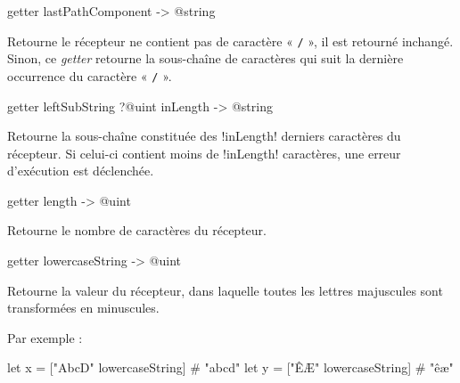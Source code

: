 
\begin{galgasbox}
getter lastPathComponent -> @string
\end{galgasbox}

Retourne le récepteur ne contient pas de caractère « \texttt{/} », il est retourné inchangé. Sinon, ce \emph{getter} retourne la sous-chaîne de caractères qui suit la dernière occurrence du caractère « \texttt{/} ».









\begin{galgasbox}
getter leftSubString ?@uint inLength -> @string
\end{galgasbox}

Retourne la sous-chaîne constituée des \ggs!inLength! derniers caractères du récepteur. Si celui-ci contient moins de \ggs!inLength! caractères, une erreur d'exécution est déclenchée.









\begin{galgasbox}
getter length -> @uint
\end{galgasbox}

Retourne le nombre de caractères du récepteur.









\begin{galgasbox}
getter lowercaseString -> @uint
\end{galgasbox}

Retourne la valeur du récepteur, dans laquelle toutes les lettres majuscules sont transformées en minuscules.

Par exemple :
\begin{galgas}
let x = ["AbcD" lowercaseString] # "abcd"
let y = ["ÊÆ" lowercaseString] # "êæ"
\end{galgas}








